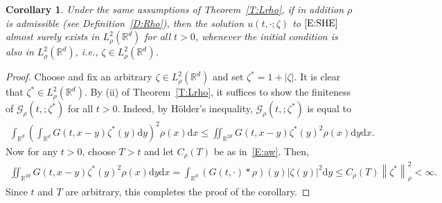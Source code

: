 \documentclass[sn-mathphys]{sn-jnl}%
\newcommand{\BR}{\mathbb{R}}
\newcommand{\Norm}[1]{\left\| #1 \right\|}
\newcommand{\ud}{\ensuremath{\mathrm{d}}}
\numberwithin{equation}{section}
\theoremstyle{thmstyleone}%
\newtheorem{corollary}[theorem]{Corollary}
\theoremstyle{thmstyletwo}%
\theoremstyle{thmstylethree}%
\begin{document}
\begin{corollary}\label{C:inclusion}
  Under the same assumptions of Theorem~\ref{T:Lrho}, if in addition $\rho$ is admissible (see
  Definition~\ref{D:Rho}), then the solution $u(t,\cdot;\zeta)$ to $\eqref{E:SHE}$ almost surely
  exists in $L^2_{\rho}(\BR^d)$ for all $t>0$, whenever the initial condition is also in
  $L^2_{\rho}(\BR^d)$, i.e., $\zeta\in L^2_{\rho}(\BR^d)$.
\end{corollary}
\begin{proof}
  Choose and fix an arbitrary $\zeta \in L^2_{\rho}(\BR^d)$ and set $\zeta^* = 1+\lvert\zeta\rvert$. It is clear
  that $\zeta^*\in L^2_\rho(\BR^d)$. By (ii) of Theorem~\ref{T:Lrho}, it suffices to show the
  finiteness of $\mathcal{G}_{\rho}(t,;\zeta^*)$ for all $t>0$. Indeed, by H\"older's inequality,
  $\mathcal{G}_{\rho}(t,;\zeta^*)$ is equal to
  \begin{align*}
     \int_{\BR^d} \left(\int_{\BR^d} G(t,x-y) \zeta^* (y) \ud y\right)^2 \rho(x) \ud x
     \le \iint_{\BR^{2d}} G(t,x-y) \zeta^* (y)^2 \rho(x) \ud y \ud x.
  \end{align*}
  Now for any $t>0$, choose $T>t$ and let $C_{\rho}(T)$ be as in~\eqref{E:aw}. Then,
  \begin{align*}
    \iint_{\BR^{2d}}G(t,x-y) \zeta^* (y)^2 \rho(x) \ud y \ud x
    = \int_{\BR^d} \left(G(t,\cdot)*\rho\right)(y) \lvert\zeta(y)\rvert^2 \ud y
    \le C_{\rho}(T) \Norm{\zeta^*}_{\rho}^2 < \infty.
  \end{align*}
  Since $t$ and $T$ are arbitrary, this completes the proof of the corollary.
\end{proof}
\end{document}
